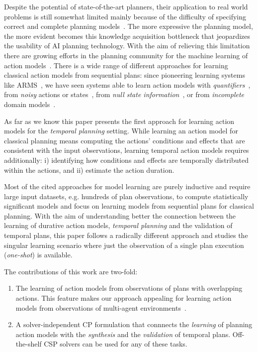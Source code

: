 \documentclass{ecai}
\begin{document}
Despite the potential of state-of-the-art planners, their application to real world problems is still somewhat limited mainly because of the difficulty of specifying correct and complete planning models~\cite{kambhampati2007model}. The more expressive the planning model, the more evident becomes this knowledge acquisition bottleneck that jeopardizes the usability of AI planning technology. With the aim of relieving this limitation there are growing efforts in the planning community for the machine learning of action models~\cite{kuvcera2018louga,MouraoZPS12,yang2007learning,zhuo2013action}. There is a  wide range of different approaches for learning classical action models from sequential plans: since pioneering learning systems like ARMS~\cite{yang2007learning}, we have seen systems able to learn action models with {\em quantifiers}~\cite{AmirC08,ZhuoYHL10}, from {\em noisy} actions or states~\cite{MouraoZPS12,zhuo2013action}, from {\em null state information}~\cite{cresswell2013}, or from {\em incomplete} domain models~\cite{ZhuoK17,ZhuoNK13}.

As far as we know this paper presents the first approach for learning action models for the {\em temporal planning} setting. While learning an action model for classical planning means computing the actions' conditions and effects that are consistent with the input observations, learning temporal action models requires additionally: i) identifying how conditions and effects are temporally distributed within the actions, and ii) estimate the action duration.

Most of the cited approaches for model learning are purely inductive and require large input datasets, e.g. hundreds of plan observations, to compute statistically significant models and focus on learning models from sequential plans for classical planning. With the aim of understanding better the connection between the learning of durative action models, {\em temporal planning}  and the validation of temporal plans, this paper follows a radically different approach and studies the singular learning scenario where just the observation of a single plan execution ({\em one-shot}) is available.

The contributions of this work are two-fold:
\begin{enumerate}  
\item The learning of action models from observations of plans with overlapping actions. This feature makes our approach appealing for learning action models from observations of multi-agent environments~\cite{furelos2018carpool}. 
\item A solver-independent CP formulation that connnects the {\em learning} of planning action models with the {\em synthesis} and the {\em validation} of temporal plans. Off-the-shelf CSP solvers can be used for any of these tasks.  
\end{enumerate}
\end{document}
